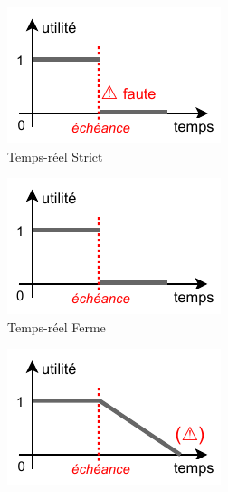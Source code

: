 \documentclass[french, a4paper, 11pt, twoside, pdftex]{StyleThese}
\begin{document}
		\begin{figure}[h!]
			\centering
			\begin{subfigure}{.3\textwidth} \centering
				\includegraphics[width=\linewidth]{schemas/SdF_TempsReelDUR}
				\caption[]{Temps-réel Strict}
				\label{fig:tempReelDur}
			\end{subfigure}
			\begin{subfigure}{.3\textwidth} \centering
				\includegraphics[width=\linewidth]{schemas/SdF_TempsReelFERME}
				\caption[]{Temps-réel Ferme}
				\label{fig:tempReelFerme}
			\end{subfigure}
			\begin{subfigure}{.3\textwidth} \centering
				\includegraphics[width=\linewidth]{schemas/SdF_TempsReelMOU}

\end{subfigure}
\end{figure}
\end{document}
